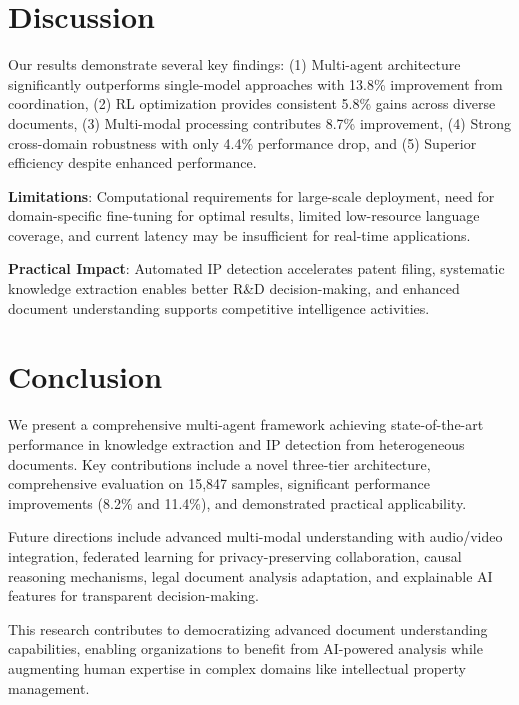 \documentclass[11pt,a4paper]{article}
\begin{document}
\section{Discussion}

Our results demonstrate several key findings: (1) Multi-agent architecture significantly outperforms single-model approaches with 13.8\% improvement from coordination, (2) RL optimization provides consistent 5.8\% gains across diverse documents, (3) Multi-modal processing contributes 8.7\% improvement, (4) Strong cross-domain robustness with only 4.4\% performance drop, and (5) Superior efficiency despite enhanced performance.

\textbf{Limitations}: Computational requirements for large-scale deployment, need for domain-specific fine-tuning for optimal results, limited low-resource language coverage, and current latency may be insufficient for real-time applications.

\textbf{Practical Impact}: Automated IP detection accelerates patent filing, systematic knowledge extraction enables better R\&D decision-making, and enhanced document understanding supports competitive intelligence activities.

\section{Conclusion}

We present a comprehensive multi-agent framework achieving state-of-the-art performance in knowledge extraction and IP detection from heterogeneous documents. Key contributions include a novel three-tier architecture, comprehensive evaluation on 15,847 samples, significant performance improvements (8.2\% and 11.4\%), and demonstrated practical applicability.

Future directions include advanced multi-modal understanding with audio/video integration, federated learning for privacy-preserving collaboration, causal reasoning mechanisms, legal document analysis adaptation, and explainable AI features for transparent decision-making.

This research contributes to democratizing advanced document understanding capabilities, enabling organizations to benefit from AI-powered analysis while augmenting human expertise in complex domains like intellectual property management.
\end{document}
